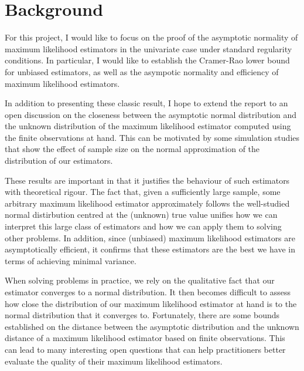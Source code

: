 \documentclass[]{STAT_547C}
\begin{document}
\vspace{-2cm}

\section{Background}

For this project, I would like to focus on the proof of the asymptotic normality of maximum likelihood estimators in the univariate case under standard regularity conditions. In particular, I would like to establish the Cramer-Rao lower bound for unbiased estimators, as well as the asympotic normality and efficiency of maximum likelihood estimators.

In addition to presenting these classic result, I hope to extend the report to an open discussion on the closeness between the asymptotic normal distribution and the unknown distribution of the maximum likelihood estimator computed using the finite observations at hand. This can be motivated by some simulation studies that show the effect of sample size on the normal approximation of the distribution of our estimators.

These results are important in that it justifies the behaviour of such estimators with theoretical rigour. The fact that, given a sufficiently large sample, some arbitrary maximum likelihood estimator approximately follows the well-studied normal distirbution centred at the (unknown) true value unifies how we can interpret this large class of estimators and how we can apply them to solving other problems. In addition, since (unbiased) maximum likelihood estimators are asymptotically efficient, it confirms that these estimators are the best we have in terms of achieving minimal variance.

When solving problems in practice, we rely on the qualitative fact that our estimator converges to a normal distribution. It then becomes difficult to assess how close the distribution of our maximum likelihood estimator at hand is to the normal distribution that it converges to. Fortunately, there are some bounds established on the distance between the asymptotic distribution and the unknown distance of a maximum likelihood estimator based on finite observations. This can lead to many interesting open questions that can help practitioners better evaluate the quality of their maximum likelihood estimators.
\end{document}
